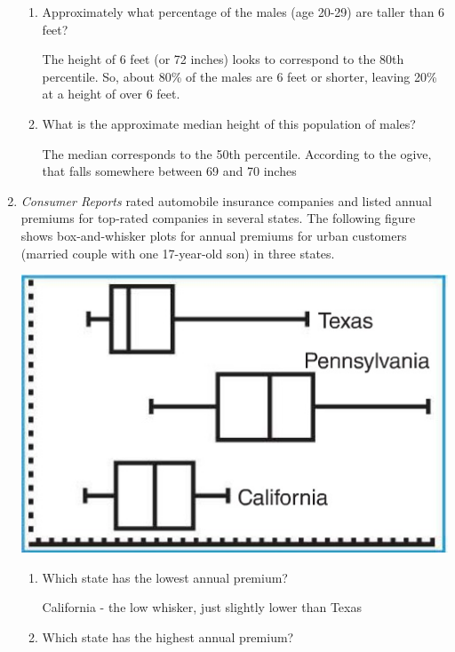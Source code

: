 \documentclass{article}
\newcommand{\answer}[1]{\color{white}#1}
\begin{document}
\begin{enumerate}
	\begin{enumerate}
	\item Approximately what percentage of the males (age 20-29) are taller than 6 feet? 
	
	{\answer{The height of 6 feet (or 72 inches) looks to correspond to the 80th percentile. So, about 80\% of the males are 6 feet or shorter, leaving 20\% at a height of over 6 feet.}} 
	
	\item What is the approximate median height of this population of males? 
	
	{\answer{The median corresponds to the 50th percentile. According to the ogive, that falls somewhere between 69 and 70 inches}} 
	\end{enumerate}

\newpage

\item {\em Consumer Reports} rated automobile insurance companies and listed annual premiums for top-rated companies in several states. The following figure shows box-and-whisker plots for annual premiums for urban customers (married couple with one 17-year-old son) in three states.

\begin{center}
\includegraphics[scale=0.7]{WS5_InsuranceBox.jpg} 
\end{center}

	\begin{enumerate}
	\item Which state has the lowest annual premium? 
	
	{\answer{California - the low whisker, just slightly lower than Texas}} 
	
	\item Which state has the highest annual premium?
	

\end{enumerate}
\end{enumerate}
\end{document}
